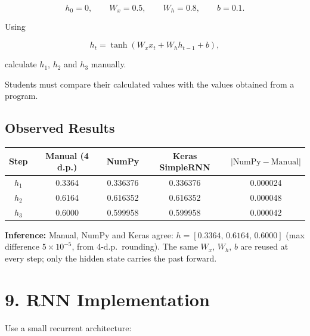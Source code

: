 \documentclass[10pt]{article}
\begin{document}
\[
h_0=0,\qquad W_x=0.5,\qquad W_h=0.8,\qquad b=0.1.
\]

Using

\[
h_t=\tanh(W_xx_t+W_hh_{t-1}+b),
\]

calculate $h_1$, $h_2$ and $h_3$ manually.

Students must compare their calculated values with the values obtained from
a program.

\subsection*{Observed Results}

\begin{center}
\begin{tabular}{|c|c|c|c|c|}
\hline
Step & Manual (4 d.p.) & NumPy & Keras SimpleRNN & $|\text{NumPy}-\text{Manual}|$\\
\hline
$h_1$ & 0.3364 & 0.336376 & 0.336376 & 0.000024\\
$h_2$ & 0.6164 & 0.616352 & 0.616352 & 0.000048\\
$h_3$ & 0.6000 & 0.599958 & 0.599958 & 0.000042\\
\hline
\end{tabular}
\end{center}

\textbf{Inference:} Manual, NumPy and Keras agree: $h=[0.3364,\,0.6164,\,0.6000]$
(max difference $5\times10^{-5}$, from 4-d.p.\ rounding). The same
$W_x,\,W_h,\,b$ are reused at every step; only the hidden state carries the
past forward.

\section*{9. RNN Implementation}

Use a small recurrent architecture:

\begin{center}
\end{center}
\end{document}
